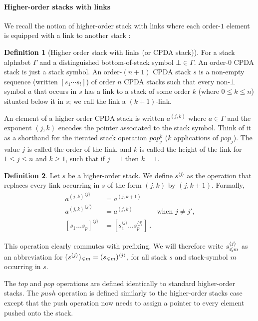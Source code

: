 \documentclass[a4paper]{article}[12pt]
\theoremstyle{remark}
\theoremstyle{definition}
\newtheorem{definition}{Definition}[section]
\begin{document}
\paragraph{Higher-order stacks with links}

We recall the notion of higher-order stack with links where each order-$1$ element is equipped with a link to another stack \cite{hague-collaps-full}:

\begin{definition}[Higher order stack with links (or CPDA stack)]
For a stack alphabet $\Gamma$ and a distinguished bottom-of-stack symbol $\bot\in \Gamma$. An order-$0$ CPDA stack is just a stack symbol. An order-$(n+1)$ CPDA stack $s$ is a non-empty sequence (written $[s_1 \cdots s_l]$) of order $n$ CPDA stacks such that every non-$\bot$ symbol $a$ that occurs in $s$ has a link to a stack of some order $k$ (where $0 \leq k \leq n$) situated below it in $s$; we call the link a $(k + 1)$-link.
\end{definition}

An element of a higher order CPDA stack is written $a^{(j,k)}$ where $a\in \Gamma$ and the exponent $(j,k)$ encodes the pointer associated to the stack symbol. Think of it as a shorthand for the iterated stack operation $pop_j^k$ ($k$ applications of $pop_j$).
The value $j$ is called the order of the link, and $k$ is called the height of the link for $1 \leq j \leq n$ and $k \geq 1$, such that if $j = 1$ then $k = 1$.

\begin{definition}
Let $s$ be a higher-order stack. We define $s^{\langle j \rangle}$ as the operation that replaces
every link occurring in $s$ of the form $(j,k)$ by $(j,k+1)$. Formally,
\begin{align*}
{a^{(j,k)}}^{\langle j \rangle} &= a^{(j,k+1)}   \\
{a^{(j,k)}}^{\langle j' \rangle} &= a^{(j,k)} &   \mbox{when $j\neq j'$,}\\
[s_1 \ldots s_p]^{\langle j \rangle} &= [s_1^{\langle j \rangle} \ldots s_p^{\langle j \rangle}] \ .
\end{align*}
\end{definition}
This operation clearly commutes with prefixing. We will therefore write $s^{\langle j\rangle}_{\leqslant m}$ as an abbreviation for
$(s^{\langle j\rangle})_{\leqslant m} = (s_{\leqslant m})^{\langle j\rangle}$,
for all stack $s$ and stack-symbol $m$ occurring in $s$.


The $top$ and $pop$ operations are defined identically to standard higher-order stacks.
The $push$ operation is defined similarly to the higher-order stacks case except that the push operation now needs to assign a pointer to every element pushed onto the stack.
\end{document}
